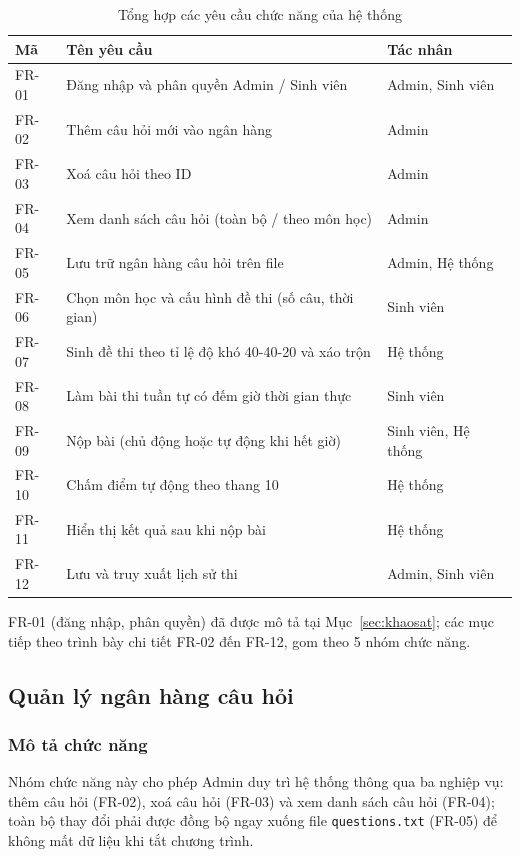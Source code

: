 \documentclass[11pt]{report}
\begin{document}
\begin{table}[H]
    \centering
    \begin{tabularx}{\textwidth}{|l|X|l|} \hline
        \textbf{Mã} & \textbf{Tên yêu cầu} & \textbf{Tác nhân} \\ \hline
        FR-01 & Đăng nhập và phân quyền Admin / Sinh viên & Admin, Sinh viên \\ \hline
        FR-02 & Thêm câu hỏi mới vào ngân hàng & Admin \\ \hline
        FR-03 & Xoá câu hỏi theo ID & Admin \\ \hline
        FR-04 & Xem danh sách câu hỏi (toàn bộ / theo môn học) & Admin \\ \hline
        FR-05 & Lưu trữ ngân hàng câu hỏi trên file & Admin, Hệ thống \\ \hline
        FR-06 & Chọn môn học và cấu hình đề thi (số câu, thời gian) & Sinh viên \\ \hline
        FR-07 & Sinh đề thi theo tỉ lệ độ khó 40-40-20 và xáo trộn & Hệ thống \\ \hline
        FR-08 & Làm bài thi tuần tự có đếm giờ thời gian thực & Sinh viên \\ \hline
        FR-09 & Nộp bài (chủ động hoặc tự động khi hết giờ) & Sinh viên, Hệ thống \\ \hline
        FR-10 & Chấm điểm tự động theo thang 10 & Hệ thống \\ \hline
        FR-11 & Hiển thị kết quả sau khi nộp bài & Hệ thống \\ \hline
        FR-12 & Lưu và truy xuất lịch sử thi & Admin, Sinh viên \\ \hline
    \end{tabularx}
    \caption{Tổng hợp các yêu cầu chức năng của hệ thống}
    \label{tab:fr_overview}
\end{table}

FR-01 (đăng nhập, phân quyền) đã được mô tả tại Mục~\ref{sec:khaosat}; các mục tiếp theo trình bày chi tiết FR-02 đến FR-12, gom theo 5 nhóm chức năng.

\subsection{Quản lý ngân hàng câu hỏi}

\subsubsection{Mô tả chức năng}

Nhóm chức năng này cho phép Admin duy trì hệ thống thông qua ba nghiệp vụ: thêm câu hỏi (FR-02), xoá câu hỏi (FR-03) và xem danh sách câu hỏi (FR-04); toàn bộ thay đổi phải được đồng bộ ngay xuống file \texttt{questions.txt} (FR-05) để không mất dữ liệu khi tắt chương trình.
\end{document}
